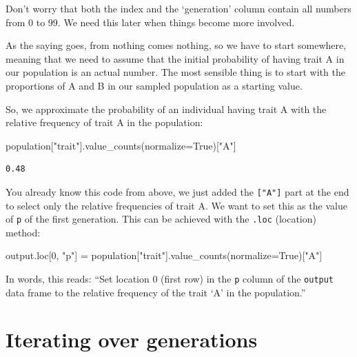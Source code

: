 \documentclass[
  a4paperpaper,
  ,captions=tableheading
]{scrbook}
\newenvironment{Shaded}{\begin{snugshade}}{\end{snugshade}}
\newcommand{\DecValTok}[1]{\textcolor[rgb]{0.68,0.00,0.00}{#1}}
\newcommand{\NormalTok}[1]{\textcolor[rgb]{0.00,0.23,0.31}{#1}}
\newcommand{\OperatorTok}[1]{\textcolor[rgb]{0.37,0.37,0.37}{#1}}
\newcommand{\StringTok}[1]{\textcolor[rgb]{0.13,0.47,0.30}{#1}}
\newcommand{\VariableTok}[1]{\textcolor[rgb]{0.07,0.07,0.07}{#1}}
\begin{document}
Don't worry that both the index and the `generation' column contain all
numbers from 0 to 99. We need this later when things become more
involved.

As the saying goes, from nothing comes nothing, so we have to start
somewhere, meaning that we need to assume that the initial probability
of having trait A in our population is an actual number. The most
sensible thing is to start with the proportions of A and B in our
sampled population as a starting value.

So, we approximate the probability of an individual having trait A with
the relative frequency of trait A in the population:

\begin{Shaded}
\begin{Highlighting}[]
\NormalTok{population[}\StringTok{"trait"}\NormalTok{].value\_counts(normalize}\OperatorTok{=}\VariableTok{True}\NormalTok{)[}\StringTok{"A"}\NormalTok{]}
\end{Highlighting}
\end{Shaded}

\begin{verbatim}
0.48
\end{verbatim}

You already know this code from above, we just added the
\texttt{{[}"A"{]}} part at the end to select only the relative
frequencies of trait A. We want to set this as the value of \texttt{p}
of the first generation. This can be achieved with the \texttt{.loc}
(location) method:

\begin{Shaded}
\begin{Highlighting}[]
\NormalTok{output.loc[}\DecValTok{0}\NormalTok{, }\StringTok{"p"}\NormalTok{] }\OperatorTok{=}\NormalTok{ population[}\StringTok{"trait"}\NormalTok{].value\_counts(normalize}\OperatorTok{=}\VariableTok{True}\NormalTok{)[}\StringTok{"A"}\NormalTok{]}
\end{Highlighting}
\end{Shaded}

In words, this reads: ``Set location 0 (first row) in the \texttt{p}
column of the \texttt{output} data frame to the relative frequency of
the trait `A' in the population.''

\hypertarget{iterating-over-generations}{%
\section{Iterating over generations}\label{iterating-over-generations}}
\end{document}

